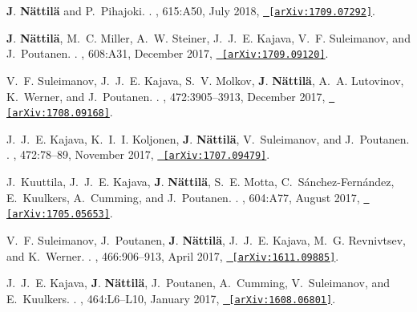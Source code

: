 \documentclass[letterpaper, onecolumn, 11pt]{article}
\begin{document}
\begin{thebibliography}{10}
\textbf{J}. \textbf{{N{\"a}ttil{\"a}}} and P.~{Pihajoki}.
.
\newblock {\em \aap}, 615:A50, July 2018,
  \href{http://arxiv.org/abs/1709.07292}{\nolinkurl{ [arXiv:1709.07292]}}.

\textbf{J}. \textbf{{N{\"a}ttil{\"a}}}, M.~C. {Miller}, A.~W. {Steiner},
  J.~J.~E. {Kajava}, V.~F. {Suleimanov}, and J.~{Poutanen}.
.
\newblock {\em \aap}, 608:A31, December 2017,
  \href{http://arxiv.org/abs/1709.09120}{\nolinkurl{ [arXiv:1709.09120]}}.

V.~F. {Suleimanov}, J.~J.~E. {Kajava}, S.~V. {Molkov}, \textbf{J}.
  \textbf{{N{\"a}ttil{\"a}}}, A.~A. {Lutovinov}, K.~{Werner}, and
  J.~{Poutanen}.
.
\newblock {\em \mnras}, 472:3905--3913, December 2017,
  \href{http://arxiv.org/abs/1708.09168}{\nolinkurl{ [arXiv:1708.09168]}}.

J.~J.~E. {Kajava}, K.~I.~I. {Koljonen}, \textbf{J}. \textbf{N{\"a}ttil{\"a}},
  V.~{Suleimanov}, and J.~{Poutanen}.
.
\newblock {\em \mnras}, 472:78--89, November 2017,
  \href{http://arxiv.org/abs/1707.09479}{\nolinkurl{ [arXiv:1707.09479]}}.

J.~{Kuuttila}, J.~J.~E. {Kajava}, \textbf{J}. \textbf{{N{\"a}ttil{\"a}}}, S.~E.
  {Motta}, C.~{S{\'a}nchez-Fern{\'a}ndez}, E.~{Kuulkers}, A.~{Cumming}, and
  J.~{Poutanen}.
.
\newblock {\em \aap}, 604:A77, August 2017,
  \href{http://arxiv.org/abs/1705.05653}{\nolinkurl{ [arXiv:1705.05653]}}.

V.~F. {Suleimanov}, J.~{Poutanen}, \textbf{J}. \textbf{N{\"a}ttil{\"a}},
  J.~J.~E. {Kajava}, M.~G. {Revnivtsev}, and K.~{Werner}.
.
\newblock {\em \mnras}, 466:906--913, April 2017,
  \href{http://arxiv.org/abs/1611.09885}{\nolinkurl{ [arXiv:1611.09885]}}.

J.~J.~E. {Kajava}, \textbf{J}. \textbf{N{\"a}ttil{\"a}}, J.~{Poutanen},
  A.~{Cumming}, V.~{Suleimanov}, and E.~{Kuulkers}.
.
\newblock {\em \mnras}, 464:L6--L10, January 2017,
  \href{http://arxiv.org/abs/1608.06801}{\nolinkurl{ [arXiv:1608.06801]}}.


\end{thebibliography}
\end{document}
